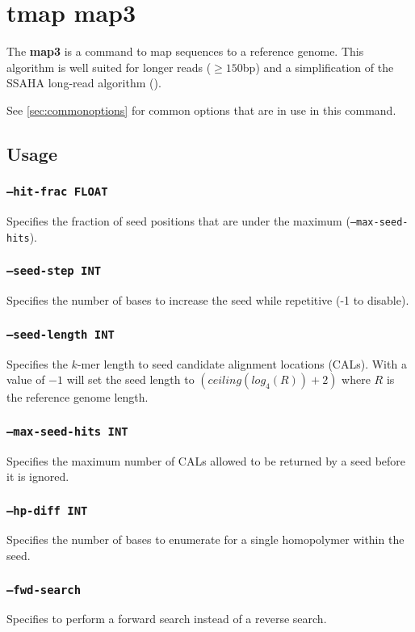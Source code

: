 \documentclass[a4paper,12pt]{book}
\newcommand{\TT}[1]{{\tt #1}} %
\newcommand{\BF}[1]{{\bf #1}} %
\begin{document}
\section{tmap map3}
\label{sec:map3}
The \BF{map3} is a command to map sequences to a reference genome.
This algorithm is well suited for longer reads ($\geq 150$bp) and a simplification of the SSAHA long-read algorithm (\cite{SSAHA}).

See \autoref{sec:commonoptions} for common options that are in use in this command.

\subsection{Usage}

\subsubsection{\TT{--hit-frac FLOAT}}
Specifies the fraction of seed positions that are under the maximum (\TT{--max-seed-hits}).

\subsubsection{\TT{--seed-step INT}}
Specifies the number of bases to increase the seed while repetitive (-1 to disable).


\subsubsection{\TT{--seed-length INT}}
Specifies the $k$-mer length to seed candidate alignment locations (CALs).
With a value of $-1$ will set the seed length to $\left(ceiling(log_4(R)) + 2\right)$ where $R$ is the reference genome length.

\subsubsection{\TT{--max-seed-hits INT}}
Specifies the maximum number of CALs allowed to be returned by a seed before it is ignored.

\subsubsection{\TT{--hp-diff INT}}
Specifies the number of bases to enumerate for a single homopolymer within the seed.

\subsubsection{\TT{--fwd-search}}
Specifies to perform a forward search instead of a reverse search.
\end{document}
